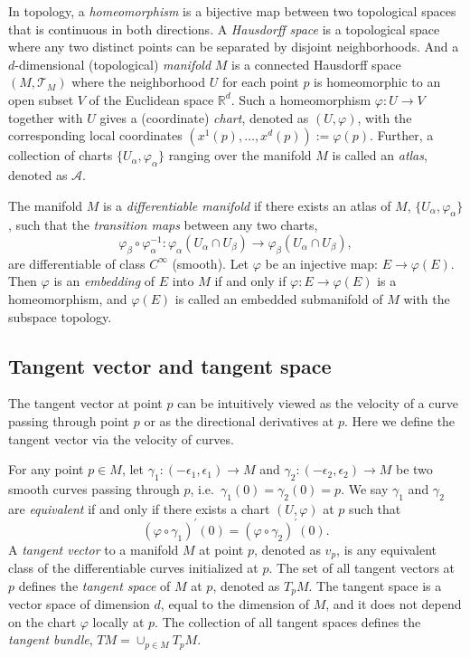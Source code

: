 \documentclass[11pt,a4paper,]{article}
\begin{document}
In topology, a \emph{homeomorphism} is a bijective map between two topological spaces that is continuous in both directions. A \emph{Hausdorff space} is a topological space where any two distinct points can be separated by disjoint neighborhoods. And a \(d\)-dimensional (topological) \emph{manifold} \(M\) is a connected Hausdorff space \((M, \mathcal{T}_M)\) where the neighborhood \(U\) for each point \(p\) is homeomorphic to an open subset \(V\) of the Euclidean space \(\mathbb{R}^d\). Such a homeomorphism \(\varphi: U \rightarrow V\) together with \(U\) gives a (coordinate) \emph{chart}, denoted as \((U, \varphi)\), with the corresponding local coordinates \((x^1(p),\dots, x^d(p)) := \varphi(p)\). Further, a collection of charts \(\{U_\alpha, \varphi_\alpha\}\) ranging over the manifold \(M\) is called an \emph{atlas}, denoted as \(\mathcal{A}\).

The manifold \(M\) is a \emph{differentiable manifold} if there exists an atlas of \(M\), \(\{U_\alpha, \varphi_\alpha\}\), such that the \emph{transition maps} between any two charts,
\[
\varphi_\beta \circ \varphi_\alpha^{-1}: \varphi_\alpha(U_\alpha \cap U_\beta) \rightarrow \varphi_\beta(U_\alpha \cap U_\beta),
\] are differentiable of class \(C^\infty\) (smooth).
Let \(\varphi\) be an injective map: \(E \rightarrow \varphi(E)\). Then \(\varphi\) is an \emph{embedding} of \(E\) into \(M\) if and only if
\(\varphi: E \rightarrow \varphi(E)\) is a homeomorphism, and \(\varphi(E)\) is called an embedded submanifold of \(M\) with the subspace topology.

\hypertarget{tangent-vector-and-tangent-space}{%
\subsection{Tangent vector and tangent space}\label{tangent-vector-and-tangent-space}}

The tangent vector at point \(p\) can be intuitively viewed as the velocity of a curve passing through point \(p\) or as the directional derivatives at \(p\). Here we define the tangent vector via the velocity of curves.

For any point \(p \in M\), let \(\gamma_1: (-\epsilon_1, \epsilon_1)\rightarrow M\) and \(\gamma_2: (-\epsilon_2, \epsilon_2)\rightarrow M\) be two smooth curves passing through \(p\), i.e.~\(\gamma_1(0) = \gamma_2(0) = p\). We say \(\gamma_1\) and \(\gamma_2\) are \emph{equivalent} if and only if there exists a chart \((U,\varphi)\) at \(p\) such that
\[
(\varphi \circ \gamma_1)^\prime(0) = (\varphi \circ \gamma_2)^\prime(0).
\]
A \emph{tangent vector} to a manifold \(M\) at point \(p\), denoted as \(v_p\), is any equivalent class of the differentiable curves initialized at \(p\). The set of all tangent vectors at \(p\) defines the \emph{tangent space} of \(M\) at \(p\), denoted as \(T_pM\). The tangent space is a vector space of dimension \(d\), equal to the dimension of \(M\), and it does not depend on the chart \(\varphi\) locally at \(p\). The collection of all tangent spaces defines the \emph{tangent bundle}, \(TM = \cup_{p \in M}T_pM\).
\end{document}
